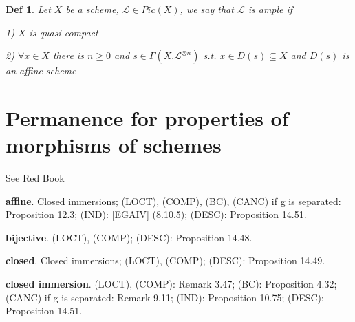 \documentclass{article}
\newtheorem{definition}[theorem]{Def}
\begin{document}
\begin{definition}
    Let $X$ be a scheme, $\mathcal L\in Pic(X)$, we say that $\mathcal L$ is ample if 

    1) $X$ is quasi-compact

    2) $\forall x\in X$ there is $n\geq0$ and $s\in\Gamma(X.\mathcal L^{\otimes n})$ s.t. $x\in D(s)\subseteq X$ and $D(s)$ is an affine scheme
\end{definition}



\newpage
\section{Permanence for properties of morphisms of schemes}

See Red Book

\textbf{affine}. Closed immersions; (LOCT), (COMP), (BC), (CANC) if g is separated: Proposition 12.3; (IND): [EGAIV] (8.10.5); (DESC): Proposition 14.51.

\textbf{bijective}. (LOCT), (COMP); (DESC): Proposition 14.48.

\textbf{closed}. Closed immersions; (LOCT), (COMP); (DESC): Proposition 14.49.

\textbf{closed immersion}. (LOCT), (COMP): Remark 3.47; (BC): Proposition 4.32; (CANC)
if g is separated: Remark 9.11; (IND): Proposition 10.75; (DESC): Proposition 14.51.
\end{document}
